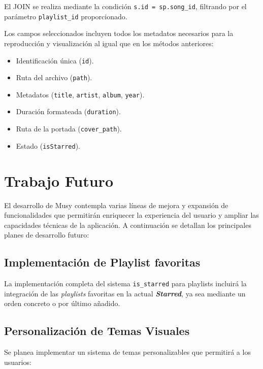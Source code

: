 \documentclass[11pt, a4paper]{article}
\begin{document}
            El JOIN se realiza mediante la condición \texttt{s.id = sp.song\_id}, filtrando por el parámetro \texttt{playlist\_id} proporcionado.

            Los campos seleccionados incluyen todos los metadatos necesarios para la reproducción y visualización al igual que en los métodos anteriores:
            \begin{itemize}
              \item Identificación única (\texttt{id}).
              \item Ruta del archivo (\texttt{path}).
              \item Metadatos (\texttt{title}, \texttt{artist}, \texttt{album}, \texttt{year}).
              \item Duración formateada (\texttt{duration}).
              \item Ruta de la portada (\texttt{cover\_path}).
              \item Estado (\texttt{isStarred}).
            \end{itemize}

\section{Trabajo Futuro}

El desarrollo de Musy contempla varias líneas de mejora y expansión de funcionalidades que permitirán enriquecer la experiencia del usuario y ampliar las capacidades técnicas de la aplicación. A continuación se detallan los principales planes de desarrollo futuro:

  \subsection{Implementación de Playlist favoritas}

  La implementación completa del sistema \texttt{is\_starred} para playlists incluirá la integración de las \textit{playlists} favoritas en la actual \textbf{\textit{Starred}}, ya sea mediante un orden concreto o por último añadido.

  \subsection{Personalización de Temas Visuales}
  Se planea implementar un sistema de temas personalizables que permitirá a los usuarios:
\end{document}
